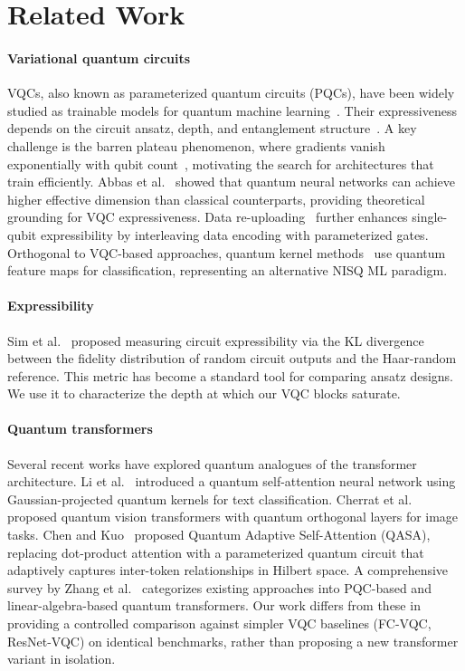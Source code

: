 \documentclass[10pt,conference]{IEEEtran}
\begin{document}
\section{Related Work}
\label{sec:related}

\paragraph{Variational quantum circuits}
VQCs, also known as parameterized quantum circuits (PQCs), have been widely studied as trainable models for quantum machine learning~\cite{cerezo2021variational, benedetti2019parameterized}.
Their expressiveness depends on the circuit ansatz, depth, and entanglement structure~\cite{schuld2021effect}.
A key challenge is the barren plateau phenomenon, where gradients vanish exponentially with qubit count~\cite{mcclean2018barren}, motivating the search for architectures that train efficiently.
Abbas et al.~\cite{abbas2021power} showed that quantum neural networks can achieve higher effective dimension than classical counterparts, providing theoretical grounding for VQC expressiveness.
Data re-uploading~\cite{perez2020data} further enhances single-qubit expressibility by interleaving data encoding with parameterized gates.
Orthogonal to VQC-based approaches, quantum kernel methods~\cite{havlicek2019supervised} use quantum feature maps for classification, representing an alternative NISQ ML paradigm.

\paragraph{Expressibility}
Sim et al.~\cite{sim2019expressibility} proposed measuring circuit expressibility via the KL divergence between the fidelity distribution of random circuit outputs and the Haar-random reference.
This metric has become a standard tool for comparing ansatz designs.
We use it to characterize the depth at which our VQC blocks saturate.

\paragraph{Quantum transformers}
Several recent works have explored quantum analogues of the transformer architecture.
Li et al.~\cite{li2022quantum_selfattn} introduced a quantum self-attention neural network using Gaussian-projected quantum kernels for text classification.
Cherrat et al.~\cite{cherrat2024quantum_vit} proposed quantum vision transformers with quantum orthogonal layers for image tasks.
Chen and Kuo~\cite{chen2025qasa} proposed Quantum Adaptive Self-Attention (QASA), replacing dot-product attention with a parameterized quantum circuit that adaptively captures inter-token relationships in Hilbert space.
A comprehensive survey by Zhang et al.~\cite{zhang2025survey_qtransformer} categorizes existing approaches into PQC-based and linear-algebra-based quantum transformers.
Our work differs from these in providing a controlled comparison against simpler VQC baselines (FC-VQC, ResNet-VQC) on identical benchmarks, rather than proposing a new transformer variant in isolation.
\end{document}
